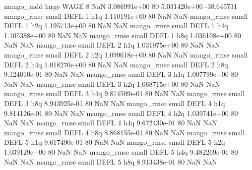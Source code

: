         mango_mdd      large     WAGE                 8                  NaN 3.086991e+00 80   5.031420e+00         -38.645731
       mango_rmse      small     DEFL                 1                  h1q 1.110191e+00 80            NaN                NaN
       mango_rmse      small     DEFL                 1                  h2q 1.195713e+00 80            NaN                NaN
       mango_rmse      small     DEFL                 1                  h4q 1.105388e+00 80            NaN                NaN
       mango_rmse      small     DEFL                 1                  h8q 1.036108e+00 80            NaN                NaN
       mango_rmse      small     DEFL                 2                  h1q 1.031975e+00 80            NaN                NaN
       mango_rmse      small     DEFL                 2                  h2q 1.099618e+00 80            NaN                NaN
       mango_rmse      small     DEFL                 2                  h4q 1.018270e+00 80            NaN                NaN
       mango_rmse      small     DEFL                 2                  h8q 9.124010e-01 80            NaN                NaN
       mango_rmse      small     DEFL                 3                  h1q 1.007799e+00 80            NaN                NaN
       mango_rmse      small     DEFL                 3                  h2q 1.068715e+00 80            NaN                NaN
       mango_rmse      small     DEFL                 3                  h4q 9.874509e-01 80            NaN                NaN
       mango_rmse      small     DEFL                 3                  h8q 8.943925e-01 80            NaN                NaN
       mango_rmse      small     DEFL                 4                  h1q 9.814126e-01 80            NaN                NaN
       mango_rmse      small     DEFL                 4                  h2q 1.039741e+00 80            NaN                NaN
       mango_rmse      small     DEFL                 4                  h4q 9.672430e-01 80            NaN                NaN
       mango_rmse      small     DEFL                 4                  h8q 8.868155e-01 80            NaN                NaN
       mango_rmse      small     DEFL                 5                  h1q 9.617490e-01 80            NaN                NaN
       mango_rmse      small     DEFL                 5                  h2q 1.039129e+00 80            NaN                NaN
       mango_rmse      small     DEFL                 5                  h4q 9.482269e-01 80            NaN                NaN
       mango_rmse      small     DEFL                 5                  h8q 8.913438e-01 80            NaN                NaN
